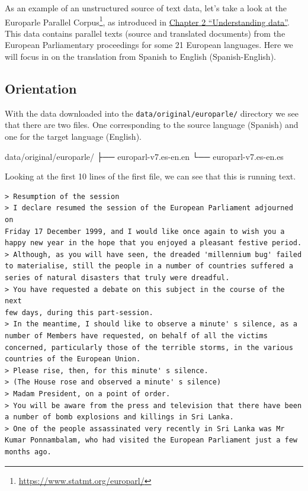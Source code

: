 \documentclass[
  letterpaper,
]{latex/krantz}
\newenvironment{Shaded}{\begin{snugshade}}{\end{snugshade}}
\newcommand{\ExtensionTok}[1]{\textcolor[rgb]{0.00,0.00,0.00}{#1}}
\newcommand{\NormalTok}[1]{\textcolor[rgb]{0.00,0.00,0.00}{#1}}
\DeclareRobustCommand{\href}[2]{#2\footnote{\url{#1}}}
\begin{document}
As an example of an unstructured source of text data, let's take a look
at the \href{https://www.statmt.org/europarl/}{Europarle Parallel
Corpus}, as introduced in
\protect\hyperlink{sec-understanding-data}{Chapter 2 ``Understanding
data''}. This data contains parallel texts (source and translated
documents) from the European Parliamentary proceedings for some 21
European languages. Here we will focus in on the translation from
Spanish to English (Spanish-English).

\hypertarget{orientation}{%
\subsection{Orientation}\label{orientation}}

With the data downloaded into the \texttt{data/original/europarle/}
directory we see that there are two files. One corresponding to the
source language (Spanish) and one for the target language (English).

\begin{Shaded}
\begin{Highlighting}[]
\ExtensionTok{data/original/europarle/}
\ExtensionTok{├──}\NormalTok{ europarl{-}v7.es{-}en.en}
\ExtensionTok{└──}\NormalTok{ europarl{-}v7.es{-}en.es}
\end{Highlighting}
\end{Shaded}

Looking at the first 10 lines of the first file, we can see that this is
running text.

\begin{verbatim}
> Resumption of the session
> I declare resumed the session of the European Parliament adjourned on
Friday 17 December 1999, and I would like once again to wish you a
happy new year in the hope that you enjoyed a pleasant festive period.
> Although, as you will have seen, the dreaded 'millennium bug' failed
to materialise, still the people in a number of countries suffered a
series of natural disasters that truly were dreadful.
> You have requested a debate on this subject in the course of the next
few days, during this part-session.
> In the meantime, I should like to observe a minute' s silence, as a
number of Members have requested, on behalf of all the victims
concerned, particularly those of the terrible storms, in the various
countries of the European Union.
> Please rise, then, for this minute' s silence.
> (The House rose and observed a minute' s silence)
> Madam President, on a point of order.
> You will be aware from the press and television that there have been
a number of bomb explosions and killings in Sri Lanka.
> One of the people assassinated very recently in Sri Lanka was Mr
Kumar Ponnambalam, who had visited the European Parliament just a few
months ago.
\end{verbatim}
\end{document}
